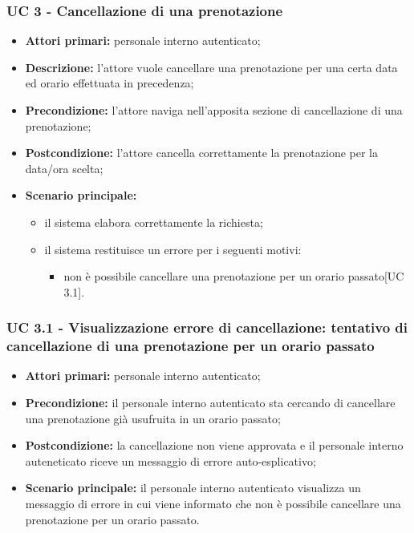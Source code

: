 \subsubsection{UC 3 - Cancellazione di una prenotazione}

\begin{itemize}
\item \textbf{Attori primari:} personale interno autenticato;
\item \textbf{Descrizione:} l'attore vuole cancellare una prenotazione per una certa data ed orario effettuata in precedenza;
\item \textbf{Precondizione:} l'attore naviga nell’apposita sezione di cancellazione di una prenotazione;
\item \textbf{Postcondizione:} l'attore cancella correttamente la prenotazione per la data/ora scelta;
\item \textbf{Scenario principale:} 
	\begin{itemize}
		\item il sistema elabora correttamente la richiesta;
		\item il sistema restituisce un errore per i seguenti motivi:
		\begin{itemize}
			\item non è possibile cancellare una prenotazione per un orario passato[UC 3.1].
		\end{itemize}
	\end{itemize}
\end{itemize}

\subsubsection{UC 3.1 - Visualizzazione errore di cancellazione: tentativo di cancellazione di una prenotazione per un orario passato}
\begin{itemize}
\item \textbf{Attori primari:} personale interno autenticato;
\item \textbf{Precondizione:} il personale interno autenticato sta cercando di cancellare una prenotazione già usufruita in un orario passato;
\item \textbf{Postcondizione:} la cancellazione non viene approvata e il personale interno auteneticato riceve un messaggio di errore auto-esplicativo;
\item \textbf{Scenario principale:} il personale interno autenticato visualizza un messaggio di errore in cui viene informato che non è possibile cancellare una prenotazione per un orario passato.
\end{itemize}

